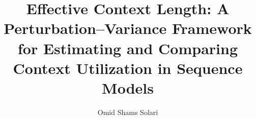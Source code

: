 \documentclass[12pt]{cs}
\title{Effective Context Length: A Perturbation--Variance Framework for Estimating and Comparing Context Utilization in Sequence Models}
\author[1]{Omid Shams Solari}
\affiliation[1]{Cerebras Systems}
\theoremstyle{remark}
\begin{document}
\maketitle

\newpage
\tableofcontents

\newpage

















\beginappendix








\end{document}
